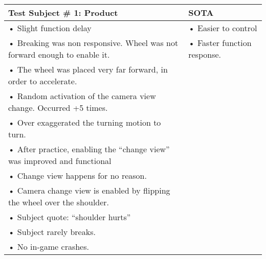 \begin{table}[!htbp]
\begin{tabular}{| p{3.4in} | p{2in} |}
\hline
\textbf{Test Subject \# 1: Product} & \textbf{SOTA}\\
\hline
\cellcolor{NotLavender}• Slight function delay & \cellcolor{NotRed}• Easier to control\\
\cellcolor{NotGreenYellow}• Breaking was non responsive. Wheel was not forward enough to enable it. & \cellcolor{NotRed}• Faster function response.\\
\cellcolor{NotGreenYellow}• The wheel was placed very far forward, in order to accelerate. & \\
\cellcolor{NotSkyBlue}• Random activation of the camera view change. Occurred +5 times. & \\
\cellcolor{NotOrange}• Over exaggerated the turning motion to turn. & \\
\cellcolor{NotSkyBlue}• After practice, enabling the “change view” was improved and functional & \\
\cellcolor{NotSkyBlue}• Change view happens for no reason. & \\
\cellcolor{NotSkyBlue}• Camera change view is enabled by flipping the wheel over the shoulder. & \\
\cellcolor{NotRed}•	Subject quote: “shoulder hurts” & \\
\cellcolor{NotGreenYellow}•	Subject rarely breaks. & \\
\cellcolor{NotGreen}•	No in-game crashes. & \\
\hline\hline


\end{tabular}
\end{table}
